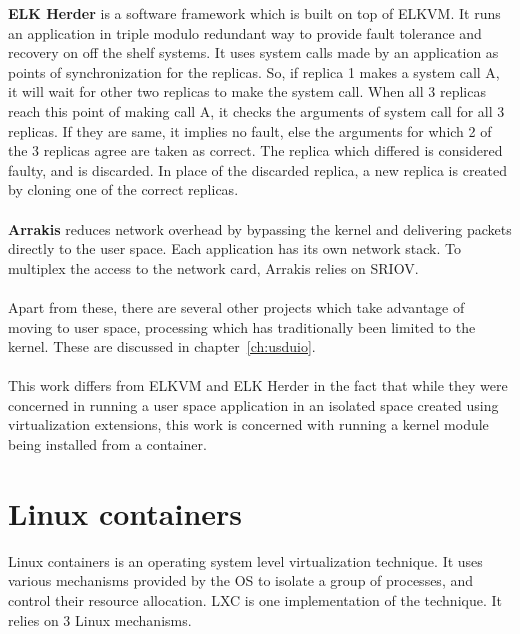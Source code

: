 \documentclass[twoside]{iitbreport}
\begin{document}
\textbf{ELK Herder}\cite{pester2014elk} is a software framework which is built on top of ELKVM. It runs an application in triple modulo redundant way to provide fault tolerance and recovery on off the shelf systems. It uses system calls made by an application as points of synchronization for the replicas. So, if replica 1 makes a system call A, it will wait for other two replicas to make the system call. When all 3 replicas reach this point of making call A, it checks the arguments of system call for all 3 replicas. If they are same, it implies no fault, else the arguments for which 2 of the 3 replicas agree are taken as correct. The replica which differed is considered faulty, and is discarded. In place of the discarded replica, a new replica is created by cloning one of the correct replicas.\\\\

\textbf{Arrakis}\cite{186140} reduces network overhead by bypassing the kernel and delivering packets directly to the user space. Each application has its own network stack. To multiplex the access to the network card, Arrakis relies on SRIOV.
\\\\
Apart from these, there are several other projects which take advantage of moving to user space, processing which has traditionally been limited to the kernel. These are discussed in chapter~\ref{ch:usduio}.
\\\\
This work differs from ELKVM and ELK Herder in the fact that while they were concerned in running a user space application in an isolated space created using virtualization extensions, this work is concerned with running a kernel module being installed from a container.


\chapter{Linux containers}
Linux containers is an operating system level virtualization technique. It uses various mechanisms provided by the OS to isolate a group of processes, and control their resource allocation. LXC is one implementation of the technique. It relies on 3 Linux mechanisms.
\end{document}

